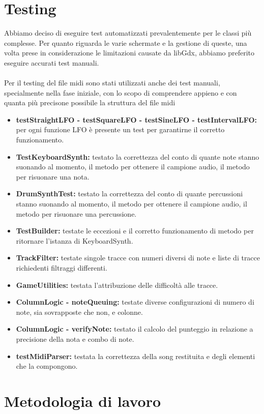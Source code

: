 \documentclass[a4paper,12pt]{report}
\begin{document}
\section{Testing}
Abbiamo deciso di eseguire test automatizzati prevalentemente per le classi più complesse. Per quanto riguarda le varie schermate e la gestione di queste, una volta prese in considerazione le limitazioni causate da libGdx, abbiamo preferito eseguire accurati test manuali. \\ \\ Per il testing del file midi sono stati utilizzati anche dei test manuali, specialmente nella fase iniziale, con lo scopo di comprendere appieno e con quanta più precisone possibile la struttura del file midi \\
{
\begin{itemize}
	\item \textbf{testStraightLFO - testSquareLFO - testSineLFO - testIntervalLFO:} per ogni funzione LFO è presente un test per garantirne il corretto funzionamento.	
	\item \textbf{TestKeyboardSynth:} testato la correttezza del conto di quante note stanno suonando al momento, il metodo per ottenere il campione audio, il metodo per risuonare una nota.	
	\item \textbf{DrumSynthTest:} testato la correttezza del conto di quante percussioni stanno suonando al momento, il metodo per ottenere il campione audio, il metodo per risuonare una percussione.	
	\item \textbf{TestBuilder:} testate le eccezioni e il corretto funzionamento di metodo per ritornare l'istanza di KeyboardSynth.
	\item \textbf{TrackFilter:} testate singole tracce con numeri diversi di note e liste di tracce richiedenti filtraggi differenti.	
	\item \textbf{GameUtilities:} testata l'attribuzione delle difficoltà alle tracce.	
	\item \textbf{ColumnLogic - noteQueuing:} testate diverse configurazioni di numero di note, sia sovrapposte che non, e colonne.	
	\item \textbf{ColumnLogic - verifyNote:} testato il calcolo del punteggio in relazione a precisione della nota e combo di note.
	\item \textbf{testMidiParser:} testata la correttezza della song restituita e degli elementi che la compongono.
\end{itemize}
}
\newpage
\section{Metodologia di lavoro}
\end{document}
